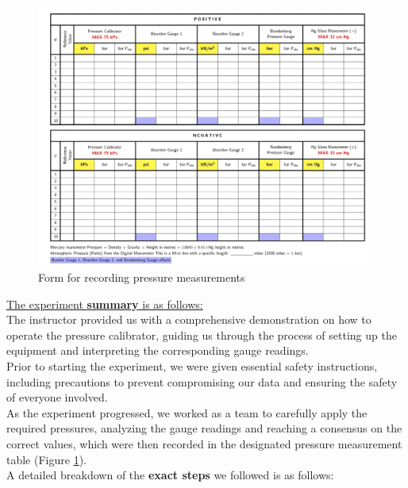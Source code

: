 \documentclass{article}
\begin{document}
	\begin{figure}[H] 
			\centering 
			\includegraphics[width=1\textwidth,cfbox=gray!15 1pt]{images/tableland-1_page-0001.jpg} 
			\caption{Form for recording pressure measurements} 
			\label{fig:pressurestable} 
	\end{figure}
	\underline{The experiment \textbf{summary} is as follows:}\\[1em]
	The instructor provided us with a comprehensive demonstration on how to operate the pressure calibrator, guiding us through the process of setting up the equipment and interpreting the corresponding gauge readings.\\[1em]
	Prior to starting the experiment, we were given essential safety instructions, including precautions to prevent compromising our data and ensuring the safety of everyone involved.\\[1em]
	As the experiment progressed, we worked as a team to carefully apply the required pressures, analyzing the gauge readings and reaching a consensus on the correct values, which were then recorded in the designated pressure measurement table (Figure \ref{fig:pressurestable}).\\[1em]
	A detailed breakdown of the \textbf{exact steps} we followed is as follows:
\newpage
{}
\end{document}
